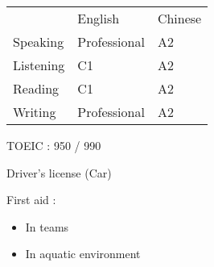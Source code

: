 \documentclass[11pt]{spidercv}
\begin{document}
\begin{SideBar}{\ColorBackground}{\ColorTextSide}
  \vspace*{1cm}


  \begin{tabular}{lll}
              & English      & Chinese \\
    \cmidrule{2-3}
    Speaking  & Professional & A2      \\
    \cmidrule{2-3}
    Listening & C1           & A2      \\
    \cmidrule{2-3}
    Reading   & C1           & A2      \\
    \cmidrule{2-3}
    Writing   & Professional & A2
  \end{tabular}

  \vspace{1cm}
  \begin{ItemList}{\ColorHighlight}
    \item [\ding{226}] TOEIC : 950 / 990
    \item [\ding{226}] Driver's license (Car)
    \item [\ding{226}] First aid :
    \begin{itemize}
      \item In teams
      \item In aquatic environment
    \end{itemize}
  \end{ItemList}
\end{SideBar}



\end{document}
